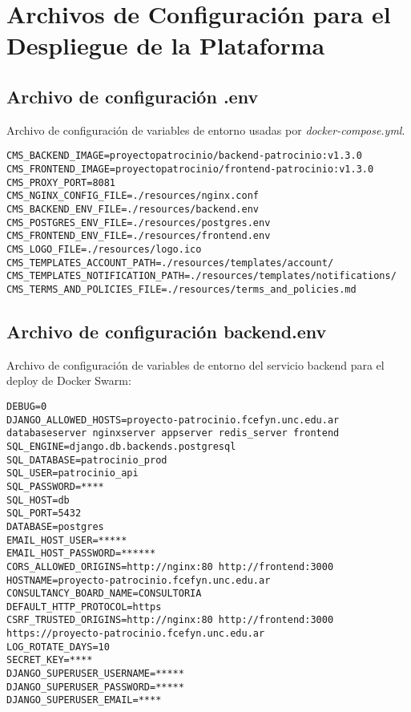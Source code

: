 \chapter{Archivos de Configuración para el Despliegue de la Plataforma}\label{cap:apendix-configfile-deloy}

\section{Archivo de configuración \textbf{.env}}\label{sec:anexo:configfile-env}
Archivo de configuración de variables de entorno usadas por \textit{docker-compose.yml}.
\begin{lstlisting}[caption={Archivo de configuración .env}, label={cod:.env}, captionpos=b]
CMS_BACKEND_IMAGE=proyectopatrocinio/backend-patrocinio:v1.3.0
CMS_FRONTEND_IMAGE=proyectopatrocinio/frontend-patrocinio:v1.3.0
CMS_PROXY_PORT=8081
CMS_NGINX_CONFIG_FILE=./resources/nginx.conf
CMS_BACKEND_ENV_FILE=./resources/backend.env
CMS_POSTGRES_ENV_FILE=./resources/postgres.env
CMS_FRONTEND_ENV_FILE=./resources/frontend.env
CMS_LOGO_FILE=./resources/logo.ico
CMS_TEMPLATES_ACCOUNT_PATH=./resources/templates/account/
CMS_TEMPLATES_NOTIFICATION_PATH=./resources/templates/notifications/
CMS_TERMS_AND_POLICIES_FILE=./resources/terms_and_policies.md
\end{lstlisting}



\section{Archivo de configuración \textbf{backend.env}}\label{sec:anexo:configfile-backend-env}
Archivo de configuración de variables de entorno del servicio backend para el deploy de Docker Swarm:

\begin{lstlisting}[caption={Archivo de configuración backend.env}, label={cod:backend.env}, captionpos=b]
DEBUG=0
DJANGO_ALLOWED_HOSTS=proyecto-patrocinio.fcefyn.unc.edu.ar databaseserver nginxserver appserver redis_server frontend
SQL_ENGINE=django.db.backends.postgresql
SQL_DATABASE=patrocinio_prod
SQL_USER=patrocinio_api
SQL_PASSWORD=****
SQL_HOST=db
SQL_PORT=5432
DATABASE=postgres
EMAIL_HOST_USER=*****
EMAIL_HOST_PASSWORD=******
CORS_ALLOWED_ORIGINS=http://nginx:80 http://frontend:3000
HOSTNAME=proyecto-patrocinio.fcefyn.unc.edu.ar
CONSULTANCY_BOARD_NAME=CONSULTORIA
DEFAULT_HTTP_PROTOCOL=https
CSRF_TRUSTED_ORIGINS=http://nginx:80 http://frontend:3000 https://proyecto-patrocinio.fcefyn.unc.edu.ar
LOG_ROTATE_DAYS=10
SECRET_KEY=****
DJANGO_SUPERUSER_USERNAME=*****
DJANGO_SUPERUSER_PASSWORD=*****
DJANGO_SUPERUSER_EMAIL=****
\end{lstlisting}


